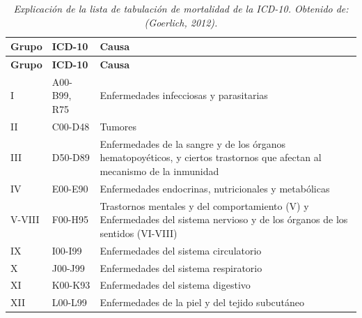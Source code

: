\documentclass[
  letterpaper,
  DIV=11,
  numbers=noendperiod]{scrartcl}
\begin{document}
\begin{longtable}[]{@{}
  >{\raggedright\arraybackslash}p{}
  >{\raggedright\arraybackslash}p{}
  >{\raggedright\arraybackslash}p{}@{}}
\caption{\emph{Explicación de la lista de tabulación de mortalidad de la
ICD-10. Obtenido de: (Goerlich, 2012).}}\tabularnewline
\toprule\noalign{}
\begin{minipage}[b]{\linewidth}\raggedright
\textbf{Grupo}
\end{minipage} & \begin{minipage}[b]{\linewidth}\raggedright
\textbf{ICD-10}
\end{minipage} & \begin{minipage}[b]{\linewidth}\raggedright
\textbf{Causa}
\end{minipage} \\
\midrule\noalign{}
\endfirsthead
\toprule\noalign{}
\begin{minipage}[b]{\linewidth}\raggedright
\textbf{Grupo}
\end{minipage} & \begin{minipage}[b]{\linewidth}\raggedright
\textbf{ICD-10}
\end{minipage} & \begin{minipage}[b]{\linewidth}\raggedright
\textbf{Causa}
\end{minipage} \\
\midrule\noalign{}
\endhead
\bottomrule\noalign{}
\endlastfoot
I & A00-B99, R75 & Enfermedades infecciosas y parasitarias \\
II & C00-D48 & Tumores \\
III & D50-D89 & Enfermedades de la sangre y de los órganos
hematopoyéticos, y ciertos trastornos que afectan al mecanismo de la
inmunidad \\
IV & E00-E90 & Enfermedades endocrinas, nutricionales y metabólicas \\
V-VIII & F00-H95 & Trastornos mentales y del comportamiento (V) y
Enfermedades del sistema nervioso y de los órganos de los sentidos
(VI-VIII) \\
IX & I00-I99 & Enfermedades del sistema circulatorio \\
X & J00-J99 & Enfermedades del sistema respiratorio \\
XI & K00-K93 & Enfermedades del sistema digestivo \\
XII & L00-L99 & Enfermedades de la piel y del tejido subcutáneo \\

\end{longtable}
\end{document}
